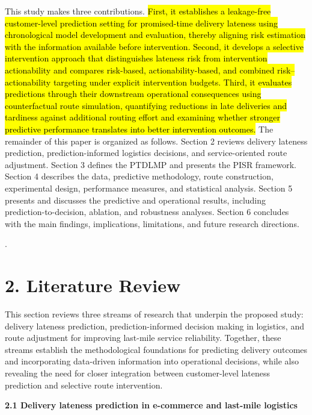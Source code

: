 \documentclass[
]{article}
\begin{document}
This study makes three contributions. \hl{First, it establishes a
leakage-free customer-level prediction setting for promised-time
delivery lateness using chronological model development and evaluation,
thereby aligning risk estimation with the information available before
intervention. Second, it develops a selective intervention approach that
distinguishes lateness risk from intervention actionability and compares
risk-based, actionability-based, and combined risk--actionability
targeting under explicit intervention budgets. Third, it evaluates
predictions through their downstream operational consequences using
counterfactual route simulation, quantifying reductions in late
deliveries and tardiness against additional routing effort and examining
whether stronger predictive performance translates into better
intervention outcomes.} The remainder of this paper is organized as
follows. Section 2 reviews delivery lateness prediction,
prediction-informed logistics decisions, and service-oriented route
adjustment. Section 3 defines the PTDLMP and presents the PISR
framework. Section 4 describes the data, predictive methodology, route
construction, experimental design, performance measures, and statistical
analysis. Section 5 presents and discusses the predictive and
operational results, including prediction-to-decision, ablation, and
robustness analyses. Section 6 concludes with the main findings,
implications, limitations, and future research directions.

.

\section{\texorpdfstring{\textbf{2. Literature
Review}}{2. Literature Review}}\label{literature-review}

This section reviews three streams of research that underpin the
proposed study: delivery lateness prediction, prediction-informed
decision making in logistics, and route adjustment for improving
last-mile service reliability. Together, these streams establish the
methodological foundations for predicting delivery outcomes and
incorporating data-driven information into operational decisions, while
also revealing the need for closer integration between customer-level
lateness prediction and selective route intervention.

\textbf{2.1 Delivery lateness prediction in e-commerce and last-mile
logistics}
\end{document}
